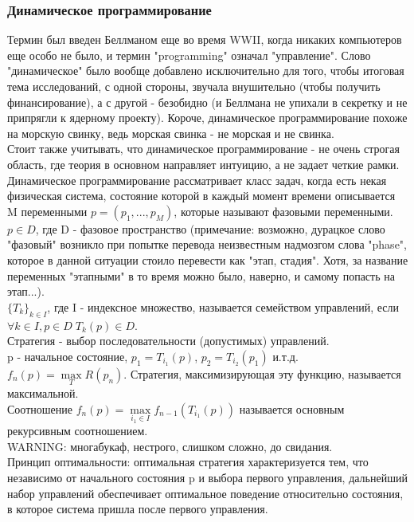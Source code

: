 \subsubsection{Динамическое программирование}
Термин был введен Беллманом еще во время WWII, когда никаких компьютеров еще особо не было, и термин "programming" означал "управление". Слово "динамическое" было вообще добавлено исключительно для того, чтобы итоговая тема исследований, с одной стороны, звучала внушительно (чтобы получить финансирование), а с другой - безобидно (и Беллмана не упихали в секретку и не припрягли к ядерному проекту). Короче, динамическое программирование похоже на морскую свинку, ведь морская свинка  - не морская и не свинка.\\
Стоит также учитывать, что динамическое программирование - не очень строгая область, где теория в основном направляет интуицию, а не задает четкие рамки.\\
Динамическое программирование рассматривает класс задач, когда есть некая физическая система, состояние которой в каждый момент времени описывается M переменными $p = (p_1, ... , p_M)$, которые называют фазовыми переменными.\\
$p \in D$, где D - фазовое пространство (примечание: возможно, дурацкое слово "фазовый" возникло при попытке перевода неизвестным надмозгом слова "phase", которое в данной ситуации стоило перевести как "этап, стадия". Хотя, за название переменных "этапными" в то время можно было, наверно, и самому попасть на этап...).\\
$\{T_k\}_{k \in I}$, где I - индексное множество, называется семейством управлений, если $\forall k \in I, p \in D \; T_k(p) \in D$.\\
Стратегия - выбор последовательности (допустимых) управлений.\\
p - начальное состояние, $p_1 = T_{i_1}(p)$, $p_2 = T_{i_2}(p_1)$ и.т.д.\\
$f_n(p) = \max\limits_{T}R(p_n)$. Стратегия, максимизирующая эту функцию, называется максимальной.\\
Соотношение $f_n(p) = \max\limits_{i_1 \in I}f_{n - 1}(T_{i_1}(p))$ называется основным рекурсивным соотношением.\\
WARNING: многабукаф, нестрого, слишком сложно, до свидания.\\
Принцип оптимальности: оптимальная стратегия характеризуется тем, что независимо от начального состояния p и выбора первого управления, дальнейший набор управлений обеспечивает оптимальное поведение относительно состояния, в которое система пришла после первого управления.
